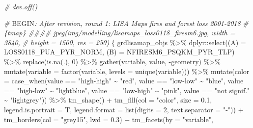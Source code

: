 \documentclass[10pt,landscape,a3paper]{article}
\newenvironment{Shaded}{\begin{snugshade}}{\end{snugshade}}
\newcommand{\AttributeTok}[1]{\textcolor[rgb]{0.77,0.63,0.00}{#1}}
\newcommand{\CommentTok}[1]{\textcolor[rgb]{0.56,0.35,0.01}{\textit{#1}}}
\newcommand{\DecValTok}[1]{\textcolor[rgb]{0.00,0.00,0.81}{#1}}
\newcommand{\FloatTok}[1]{\textcolor[rgb]{0.00,0.00,0.81}{#1}}
\newcommand{\FunctionTok}[1]{\textcolor[rgb]{0.00,0.00,0.00}{#1}}
\newcommand{\NormalTok}[1]{#1}
\newcommand{\OtherTok}[1]{\textcolor[rgb]{0.56,0.35,0.01}{#1}}
\newcommand{\RegionMarkerTok}[1]{#1}
\newcommand{\SpecialCharTok}[1]{\textcolor[rgb]{0.00,0.00,0.00}{#1}}
\newcommand{\StringTok}[1]{\textcolor[rgb]{0.31,0.60,0.02}{#1}}
\begin{document}
\begin{Shaded}
\begin{Highlighting}[]
\CommentTok{\# dev.off()}

\CommentTok{\# }\RegionMarkerTok{BEGIN}\CommentTok{: After revision, round 1: LISA Maps fires and forest loss 2001{-}2018}
\CommentTok{\# \{tmap\} \#\#\#\# jpeg(\textquotesingle{}img/modelling/lisamaps\_loss0118\_firesm6.jpg\textquotesingle{}, width = 3840,}
\CommentTok{\# height = 1500, res = 250)}
\NormalTok{\{}
\NormalTok{    grdlisamap\_objs }\SpecialCharTok{\%\textgreater{}\%}
\NormalTok{        dplyr}\SpecialCharTok{::}\FunctionTok{select}\NormalTok{(}\StringTok{\textasciigrave{}}\AttributeTok{(A)}\StringTok{\textasciigrave{}} \OtherTok{=}\NormalTok{ LOSS0118\_PUA\_PYR\_NORM, }\StringTok{\textasciigrave{}}\AttributeTok{(B)}\StringTok{\textasciigrave{}} \OtherTok{=}\NormalTok{ NFIRESM6\_PSQKM\_PYR\_TLP) }\SpecialCharTok{\%\textgreater{}\%}
        \FunctionTok{replace}\NormalTok{(}\FunctionTok{is.na}\NormalTok{(.), }\DecValTok{0}\NormalTok{) }\SpecialCharTok{\%\textgreater{}\%}
        \FunctionTok{gather}\NormalTok{(variable, value, }\SpecialCharTok{{-}}\NormalTok{geometry) }\SpecialCharTok{\%\textgreater{}\%}
        \FunctionTok{mutate}\NormalTok{(}\AttributeTok{variable =} \FunctionTok{factor}\NormalTok{(variable, }\AttributeTok{levels =} \FunctionTok{unique}\NormalTok{(variable))) }\SpecialCharTok{\%\textgreater{}\%}
        \FunctionTok{mutate}\NormalTok{(}\AttributeTok{color =} \FunctionTok{case\_when}\NormalTok{(value }\SpecialCharTok{==} \StringTok{"high{-}high"} \SpecialCharTok{\textasciitilde{}} \StringTok{"red"}\NormalTok{, value }\SpecialCharTok{==} \StringTok{"low{-}low"} \SpecialCharTok{\textasciitilde{}}
            \StringTok{"blue"}\NormalTok{, value }\SpecialCharTok{==} \StringTok{"high{-}low"} \SpecialCharTok{\textasciitilde{}} \StringTok{"lightblue"}\NormalTok{, value }\SpecialCharTok{==} \StringTok{"low{-}high"} \SpecialCharTok{\textasciitilde{}} \StringTok{"pink"}\NormalTok{,}
\NormalTok{            value }\SpecialCharTok{==} \StringTok{"not signif."} \SpecialCharTok{\textasciitilde{}} \StringTok{"lightgrey"}\NormalTok{)) }\SpecialCharTok{\%\textgreater{}\%}
        \FunctionTok{tm\_shape}\NormalTok{() }\SpecialCharTok{+} \FunctionTok{tm\_fill}\NormalTok{(}\AttributeTok{col =} \StringTok{"color"}\NormalTok{, }\AttributeTok{size =} \FloatTok{0.1}\NormalTok{, }\AttributeTok{legend.is.portrait =}\NormalTok{ T, }\AttributeTok{legend.format =} \FunctionTok{list}\NormalTok{(}\AttributeTok{digits =} \DecValTok{2}\NormalTok{,}
        \AttributeTok{text.separator =} \StringTok{"{-}"}\NormalTok{)) }\SpecialCharTok{+} \FunctionTok{tm\_borders}\NormalTok{(}\AttributeTok{col =} \StringTok{"grey15"}\NormalTok{, }\AttributeTok{lwd =} \FloatTok{0.3}\NormalTok{) }\SpecialCharTok{+} \FunctionTok{tm\_facets}\NormalTok{(}\AttributeTok{by =} \StringTok{"variable"}\NormalTok{,}

\end{Highlighting}
\end{Shaded}
\end{document}
